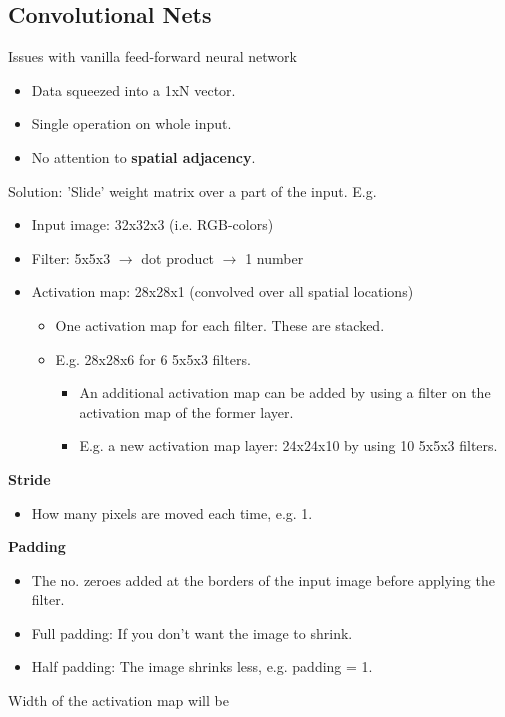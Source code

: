 \documentclass[12pt, a4paper]{article}
\begin{document}
\begin{spacing}{1.213}
\section{Convolutional Nets}
\begin{multicols}{2}\noindent
Issues with vanilla feed-forward neural network
\begin{itemize}
  \item Data squeezed into a 1xN vector.
  \item Single operation on whole input.
  \item No attention to \textbf{spatial adjacency}.
\end{itemize}
Solution: 'Slide' weight matrix over a part of the input. E.g.
\begin{itemize}
  \item Input image: 32x32x3 (i.e. RGB-colors)
  \item Filter: 5x5x3 $\rightarrow$ dot product $\rightarrow$ 1 number
  \item Activation map: 28x28x1 (convolved over all spatial locations)
  \begin{itemize}
    \item One activation map for each filter. These are stacked.
    \item E.g. 28x28x6 for 6 5x5x3 filters.
    \begin{itemize}
      \item An additional activation map can be added by using a filter on the activation map of the former layer.
      \item E.g. a new activation map layer: 24x24x10 by using 10 5x5x3 filters.
    \end{itemize}
  \end{itemize}
\end{itemize}
\textbf{Stride}
\begin{itemize}
  \item How many pixels are moved each time, e.g. 1.
\end{itemize}
\textbf{Padding}
\begin{itemize}
  \item The no. zeroes added at the borders of the input image before applying the filter.
  \item Full padding: If you don't want the image to shrink.
  \item Half padding: The image shrinks less, e.g. padding = 1.
\end{itemize}
Width of the activation map will be
\begin{align*}

\end{align*}
\end{multicols}
\end{spacing}
\end{document}
